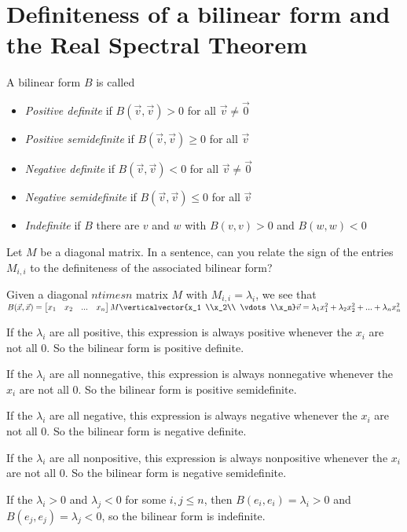 
\section{Definiteness of a bilinear form and the Real Spectral Theorem}

\begin{definition}
	A bilinear form $B$ is called 
	\begin{itemize}
		\item \textit{Positive definite} if $B(\vec{v},\vec{v}) > 0 $ for all $\vec{v} \neq \vec{0}$
		\item \textit{Positive semidefinite} if $B(\vec{v},\vec{v}) \geq 0 $ for all $\vec{v}$
		\item \textit{Negative definite} if $B(\vec{v},\vec{v}) < 0 $ for all $\vec{v} \neq \vec{0}$
		\item \textit{Negative semidefinite} if $B(\vec{v},\vec{v}) \leq 0 $ for all $\vec{v}$	
		\item \textit{Indefinite} if $B$ there are $v$ and $w$ with $B(v,v)>0$ and $B(w,w)<0$
		\end{itemize}
\end{definition}



	Let $M$ be a diagonal matrix.  In a sentence, can you relate the sign of the entries $M_{i,i}$ to the definiteness of the associated bilinear form? 
	
	\begin{free-response}
		Given a diagonal $n times n$ matrix $M$ with $M_{i,i} = \lambda_i$, we see that 
		\(
		B(\vec{x},\vec{x}) = \begin{bmatrix} x_1 & x_2 & ...& x_n\end{bmatrix} M  \verticalvector{x_1 \\x_2\\ \vdots \\x_n}\vec{v} = \lambda_1x_1^2 +\lambda_2x_2^2+...+\lambda_nx_n^2
		\)
		
		If the $\lambda_i$ are all positive, this expression is always positive whenever the $x_i$ are not all $0$.  So the bilinear form is positive definite.
		
		If the $\lambda_i$ are all nonnegative, this expression is always nonnegative whenever the $x_i$ are not all $0$.  So the bilinear form is positive semidefinite.
		
		If the $\lambda_i$ are all negative, this expression is always negative whenever the $x_i$ are not all $0$.  So the bilinear form is negative definite.
		
		If the $\lambda_i$ are all nonpositive, this expression is always nonpositive whenever the $x_i$ are not all $0$.  So the bilinear form is negative  semidefinite.
		
		If the $\lambda_i>0$ and $\lambda_j<0$  for some $i,j\leq n$, then $B(e_i,e_i) = \lambda_i >0$ and $B(e_j,e_j) = \lambda_j <0$, so the bilinear form 
		is indefinite. 
		 
	\end{free-response}

